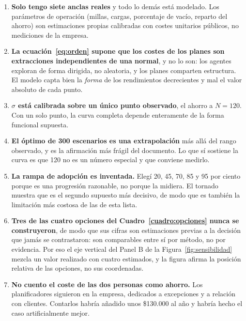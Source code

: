 \documentclass[11pt,letterpaper]{article}
\begin{document}
\begin{enumerate}
\item \textbf{Solo tengo siete anclas reales} y todo lo demás está modelado.
  Los parámetros de operación (millas, cargas, porcentaje de vacío, reparto
  del ahorro) son estimaciones propias calibradas con costes unitarios
  públicos, no mediciones de la empresa.
\item \textbf{La ecuación~\eqref{eq:orden} supone que los costes de los planes
  son extracciones independientes de una normal}, y no lo son: los agentes
  exploran de forma dirigida, no aleatoria, y los planes comparten estructura.
  El modelo capta bien la \emph{forma} de los rendimientos decrecientes y mal
  el valor absoluto de cada punto.
\item \textbf{$\sigma$ está calibrada sobre un único punto observado}, el
  ahorro a $N = 120$. Con un solo punto, la curva completa depende enteramente
  de la forma funcional supuesta.
\item \textbf{El óptimo de 300 escenarios es una extrapolación} más allá del
  rango observado, y es la afirmación más frágil del documento. Lo que sí
  sostiene la curva es que 120 no es un número especial y que conviene medirlo.
\item \textbf{La rampa de adopción es inventada.} Elegí 20, 45, 70, 85 y 95
  por ciento porque es una progresión razonable, no porque la midiera. El
  tornado muestra que es el segundo supuesto más decisivo, de modo que es
  también la limitación más costosa de las de esta lista.
\item \textbf{Tres de las cuatro opciones del Cuadro~\ref{cuadro:opciones}
  nunca se construyeron}, de modo que sus cifras son estimaciones previas a la
  decisión que jamás se contrastaron: son comparables entre sí por método, no
  por evidencia. Por eso el eje vertical del Panel B de la
  Figura~\ref{fig:sensibilidad} mezcla un valor realizado con cuatro
  estimados, y la figura afirma la posición relativa de las opciones, no sus
  coordenadas.
\item \textbf{No cuento el coste de las dos personas como ahorro.} Los
  planificadores siguieron en la empresa, dedicados a excepciones y a relación
  con clientes. Contarlos habría añadido unos \$130.000 al año y habría hecho
  el caso artificialmente mejor.
\end{enumerate}

\printbibliography
\end{document}
